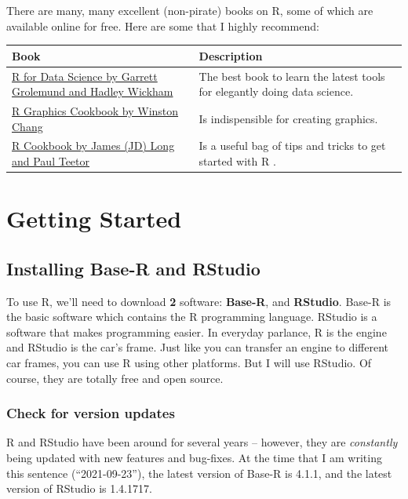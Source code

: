 \documentclass[
]{book}
\begin{document}
There are many, many excellent (non-pirate) books on R, some of which are available online for free. Here are some that I highly recommend:

\begin{longtable}[]{@{}
  >{\raggedright\arraybackslash}p{}
  >{\raggedright\arraybackslash}p{}@{}}
\toprule
Book & Description \\
\midrule
\endhead
\href{http://r4ds.had.co.nz/}{R for Data Science by Garrett Grolemund and Hadley Wickham} & The best book to learn the latest tools for elegantly doing data science. \\
\href{http://www.cookbook-r.com/Graphs/}{R Graphics Cookbook by Winston Chang} & Is indispensible for creating graphics. \\
\href{https://rc2e.com/index.html}{R Cookbook by James (JD) Long and Paul Teetor} & Is a useful bag of tips and tricks to get started with R . \\
\bottomrule
\end{longtable}

\hypertarget{get-started}{%
\chapter{Getting Started}\label{get-started}}

\hypertarget{INSTALL-GET-STARTED}{%
\section{Installing Base-R and RStudio}\label{INSTALL-GET-STARTED}}

To use R, we'll need to download \textbf{2} software: \textbf{Base-R}, and \textbf{RStudio}. Base-R is the basic software which contains the R programming language. RStudio is a software that makes programming easier. In everyday parlance, R is the engine and RStudio is the car's frame. Just like you can transfer an engine to different car frames, you can use R using other platforms. But I will use RStudio. Of course, they are totally free and open source.

\hypertarget{check-for-version-updates}{%
\subsection{Check for version updates}\label{check-for-version-updates}}

R and RStudio have been around for several years -- however, they are \emph{constantly} being updated with new features and bug-fixes. At the time that I am writing this sentence (``2021-09-23''), the latest version of Base-R is 4.1.1, and the latest version of RStudio is 1.4.1717.
\end{document}
